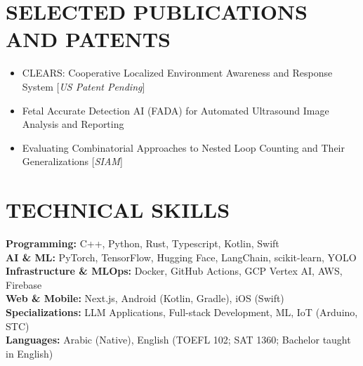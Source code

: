 \documentclass[11pt,a4paper]{article}
\begin{document}
\section*{SELECTED PUBLICATIONS AND PATENTS}
\begin{itemize}[leftmargin=0em, nosep, label={}]
    \item CLEARS: Cooperative Localized Environment Awareness and Response System [\textit{US Patent Pending}]
    \item Fetal Accurate Detection AI (FADA) for Automated Ultrasound Image Analysis and Reporting
    \item Evaluating Combinatorial Approaches to Nested Loop Counting and Their Generalizations [\textit{SIAM}]
\end{itemize}

\section*{TECHNICAL SKILLS}
\textbf{Programming:} C++, Python, Rust, Typescript, Kotlin, Swift \\[2pt]
\textbf{AI \& ML:} PyTorch, TensorFlow, Hugging Face, LangChain, scikit-learn, YOLO \\[2pt]
\textbf{Infrastructure \& MLOps:} Docker, GitHub Actions, GCP Vertex AI, AWS, Firebase \\[2pt]
\textbf{Web \& Mobile:} Next.js, Android (Kotlin, Gradle), iOS (Swift) \\[2pt]
\textbf{Specializations:} LLM Applications, Full-stack Development, ML, IoT (Arduino, STC) \\[2pt]
\textbf{Languages:} Arabic (Native), English (TOEFL 102; SAT 1360; Bachelor taught in English)
\end{document}
